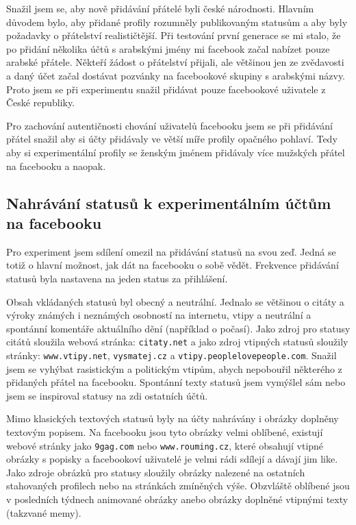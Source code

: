 \documentclass[thesis=M,czech]{FITthesis}[2013/05/10]
\begin{document}
Snažil jsem se, aby nově přidávání přátelé byli české národnosti. Hlavním důvodem bylo, aby přidané profily rozumněly publikovaným statusům a aby byly požadavky o přátelství realističtější. Při testování první generace se mi stalo, že po přidání několika účtů s arabskými jmény mi facebook začal nabízet pouze arabské přátele. Někteří žádost o přátelství přijali, ale většinou jen ze zvědavosti a daný účet začal dostávat pozvánky na facebookové skupiny s arabskými názvy. Proto jsem se při experimentu snažil přidávat pouze facebookové uživatele z České republiky.

Pro zachování autentičnosti chování uživatelů facebooku jsem se při přidávání přátel snažil aby si účty přidávaly ve větší míře profily opačného pohlaví. Tedy aby si experimentální profily se ženským jménem přidávaly více mužských přátel na facebooku a naopak. 

\subsection{Nahrávání statusů k experimentálním účtům na facebooku}

Pro experiment jsem sdílení omezil na přidávání statusů na svou zeď. Jedná se totiž o hlavní možnost, jak dát na facebooku o sobě vědět. Frekvence přidávání statusů byla nastavena na jeden status za přihlášení. 

Obsah vkládaných statusů byl obecný a neutrální. Jednalo se většinou o citáty a výroky známých i neznámých osobností na internetu, vtipy a neutrální a spontánní komentáře aktuálního dění (například o počasí). Jako zdroj pro statusy citátů sloužila webová stránka: \verb|citaty.net| a jako zdroj vtipných statusů sloužily stránky: \verb|www.vtipy.net|, \verb|vysmatej.cz| a \verb|vtipy.peoplelovepeople.com|. Snažil jsem se vyhýbat rasistickým a politickým vtipům, abych nepobouřil některého z přidaných přátel na facebooku. Spontánní texty statusů jsem vymýšlel sám nebo jsem se inspiroval statusy na zdi ostatních účtů.

Mimo klasických textových statusů byly na účty nahrávány i obrázky doplněny textovým popisem. Na facebooku jsou tyto obrázky velmi oblíbené, existují webové stránky jako \verb|9gag.com| nebo \verb|www.rouming.cz|, které obsahují vtipné obrázky s popisky a facebookoví uživatelé je velmi rádi  sdílejí a dávají jim like. Jako zdroje obrázků pro statusy sloužily obrázky nalezené na ostatních stahovaných profilech nebo na stránkách zmíněných výše. Obzvláště oblíbené jsou v posledních týdnech animované obrázky anebo obrázky doplněné vtipnými texty (takzvané memy).
\end{document}
